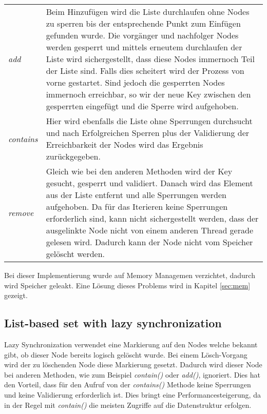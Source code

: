 \begin{table}[H]
    \begin{tabularx}{\textwidth}{lX}
		\textit{add} & Beim Hinzufügen wird die Liste durchlaufen ohne Nodes zu sperren bis der entsprechende Punkt zum Einfügen gefunden wurde. 
		Die vorgänger und nachfolger Nodes werden gesperrt und mittels erneutem durchlaufen der Liste wird sichergestellt, dass diese Nodes immernoch Teil der 
		Liste sind. Falls dies scheitert wird der Prozess von vorne gestartet. Sind jedoch die gesperrten Nodes immernoch erreichbar, so wir der neue Key 
		zwischen den gesperrten eingefügt und die Sperre wird aufgehoben.\\
		\textit{contains} & Hier wird ebenfalls die Liste ohne Sperrungen durchsucht und nach Erfolgreichen Sperren plus der Validierung der Erreichbarkeit 
		der Nodes wird das Ergebnis zurückgegeben.\\
		\textit{remove} & Gleich wie bei den anderen Methoden wird der Key gesucht, gesperrt und validiert. Danach wird das Element aus der Liste entfernt und 
		alle Sperrungen werden aufgehoben. Da für das Iterieren keine Sperrungen erforderlich sind, kann nicht sichergestellt werden, dass der ausgelinkte
		Node nicht von einem anderen Thread gerade gelesen wird. Dadurch kann der Node nicht vom Speicher gelöscht werden.\\
    \end{tabularx}
\end{table}

Bei dieser Implementierung wurde auf Memory Managemen verzichtet, dadurch wird Speicher geleakt.
Eine Lösung dieses Problems wird in Kapitel \ref{sec:mem} gezeigt.

\subsection{List-based set with lazy synchronization}

Lazy Synchronization verwendet eine Markierung auf den Nodes welche bekannt gibt, ob dieser Node bereits logisch gelöscht wurde. 
Bei einem Lösch-Vorgang wird der zu löschenden Node diese Markierung gesetzt. Dadurch wird dieser Node bei anderen Methoden, 
wie zum Beispiel \textit{contain()} oder \textit{add()}, ignoriert. Dies hat den Vorteil, 
dass für den Aufruf von der \textit{contains()} Methode keine Sperrungen und keine Validierung erforderlich ist.
Dies bringt eine Performancesteigerung, da in der Regel mit \textit{contain()} die meisten Zugriffe auf die Datenstruktur erfolgen. 


